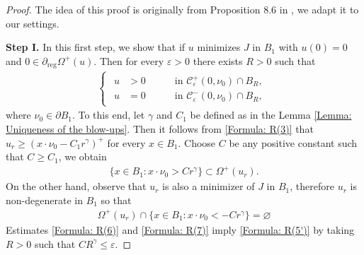 \documentclass[11pt,reqno]{amsart}
\begin{document}
\begin{proof}
	The idea of this proof is originally from Proposition 8.6 in \cite{V2019}, we adapt it to our settings.
	
	\textbf{Step I.} In this first step, we show that if $u$ minimizes $J$ in $B_{1}$ with $u(0)=0$ and $0\in\partial_{\mathrm{reg}}\varOmega^{+}(u)$. Then for every $\varepsilon>0$ there exists $R>0$ such that
	\begin{align}\label{Formula: R(5')}
		\begin{cases}
			\begin{alignedat}{2}
				u&>0\quad&&\text{ in }\mathcal{C}_{\varepsilon}^{+}(0,\nu_{0})\cap B_{R},\\
				u&=0\quad&&\text{ in }\mathcal{C}_{\varepsilon}^{-}(0,\nu_{0})\cap B_{R},
			\end{alignedat}
		\end{cases}
	\end{align}
	where $\nu_{0}\in\partial B_{1}$. To this end, let $\gamma$ and $C_{1}$ be defined as in the Lemma \ref{Lemma: Uniqueness of the blow-ups}. Then it follows from \eqref{Formula: R(3)} that $u_{r}\geqslant(x\cdot\nu_{0}-C_{1}r^{\gamma})^{+}$ for every $x\in B_{1}$. Choose $C$ be any positive constant such that $C\geqslant C_{1}$, we obtain
	\begin{align}\label{Formula: R(6)}
		\{x\in B_{1}\colon x\cdot\nu_{0}>Cr^{\gamma}\}\subset\varOmega^{+}(u_{r}).
	\end{align}
	On the other hand, observe that  $u_{r}$ is also a minimizer of $J$ in $B_{1}$, therefore $u_{r}$ is non-degenerate in $B_{1}$ so that 
	\begin{align}\label{Formula: R(7)}
		\varOmega^{+}(u_{r})\cap\{x\in B_{1}\colon x\cdot\nu_{0}<-Cr^{\gamma}\}=\varnothing
	\end{align}
	Estimates \eqref{Formula: R(6)} and \eqref{Formula: R(7)} imply \eqref{Formula: R(5')} by taking $R>0$ such that $CR^{\gamma}\leqslant\varepsilon$.
	

\end{proof}
\end{document}
